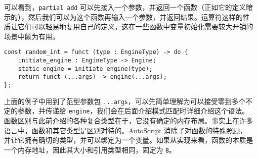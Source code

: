 可以看到，\texttt{partial add} 可以先接入一个参数，并返回一个函数（正如它的定义暗示的），然后我们可以为这个函数再输入一个参数，并返回结果。运算符这样的性质让它们可以轻易地复用自己的定义，这在一些函数中变量初始化需要较大开销的场景中颇为有用。

\begin{lstlisting}
const random_int = funct (type : EngineType) -> do {
    initiate_engine : EngineType -> Engine;
    static engine = initiate_engine(type);
    return funct (...args) -> engine(...args);
};
\end{lstlisting}

上面的例子中用到了范型参数包 \lstinline!...args!，可以先简单理解为可以接受零到多个不定的参数，并传递给 \lstinline!engine!，我们会在后面介绍模式匹配时详细介绍这个语法。 \\

函数区别与此前介绍的各种复合类型在于，它没有确定的内存布局。事实上在许多语言中，函数和其它类型是区别对待的。AutoScript 消除了对函数的特殊照顾，并让它拥有确切的类型，并可以绑定为一个变量。如果从实现来看，函数的本质是一个内存地址，因此其大小和引用类型相同，固定为 \lstinline!8!。